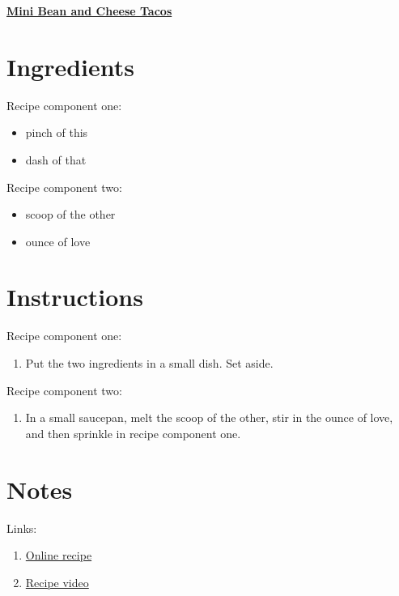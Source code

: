\documentclass[11pt]{article}
\begin{document}
	\begin{center}\begin{huge}\underline{\textbf{Mini Bean and Cheese Tacos}}\end{huge}\end{center}

	\section*{Ingredients}
	Recipe component one:\vspace*{-1.5ex}
	\begin{itemize}
		\item pinch of this
		\item dash of that
	\end{itemize}
	
	Recipe component two:\vspace*{-1.5ex}
	\begin{itemize}
		\item scoop of the other
		\item ounce of love
	\end{itemize}
	
	\section*{Instructions}
	Recipe component one:
	\begin{enumerate}
		\item Put the two ingredients in a small dish. Set aside.
	\end{enumerate}
	Recipe component two:
	\begin{enumerate}
		\item In a small saucepan, melt the scoop of the other, stir in the ounce of love, and then sprinkle in recipe component one.
	\end{enumerate}
	
	\section*{Notes}
	Links:
	\begin{enumerate}
		\item \href{link-to-online-recipe-if-applicable}{Online recipe}
		\item\href{link-to-video-if-applicable}{Recipe video} 
	\end{enumerate}
	
\end{document}
